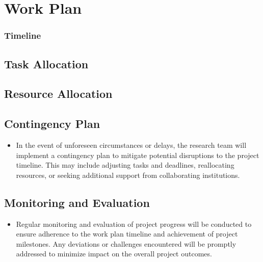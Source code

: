 



% 

\section{Work Plan}

\subsubsection*{Timeline}




\subsection*{Task Allocation}




\subsection*{Resource Allocation}



\subsection*{Contingency Plan}

\begin{itemize}
    \item In the event of unforeseen circumstances or delays, the research team will implement a contingency plan to mitigate potential disruptions to the project timeline. This may include adjusting tasks and deadlines, reallocating resources, or seeking additional support from collaborating institutions.
\end{itemize}

\subsection*{Monitoring and Evaluation}

\begin{itemize}
    \item Regular monitoring and evaluation of project progress will be conducted to ensure adherence to the work plan timeline and achievement of project milestones. Any deviations or challenges encountered will be promptly addressed to minimize impact on the overall project outcomes.
\end{itemize}

% 